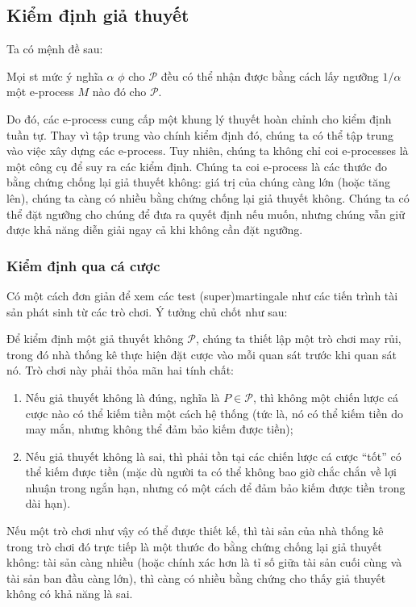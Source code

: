 \subsection{Kiểm định giả thuyết}

Ta có mệnh đề sau:

\begin{prop}
  Mọi \gls{st} mức ý nghĩa $\alpha$ $\phi$ cho $\mathcal{P}$ đều có thể nhận
  được bằng cách lấy ngưỡng $1/\alpha$ một e-process $M$ nào đó cho
  $\mathcal{P}$.
\end{prop}

Do đó, các e-process cung cấp một khung lý thuyết hoàn chỉnh cho kiểm định
tuần tự. Thay vì tập trung vào chính kiểm định đó, chúng ta có thể tập trung
vào việc xây dựng các e-process. Tuy nhiên, chúng ta không chỉ coi e-processes
là một công cụ để suy ra các kiểm định. Chúng ta coi e-process là các thước đo
bằng chứng chống lại giả thuyết không: giá trị của chúng càng lớn (hoặc tăng
lên), chúng ta càng có nhiều bằng chứng chống lại giả thuyết không. Chúng ta
có thể đặt ngưỡng cho chúng để đưa ra quyết định nếu muốn, nhưng chúng vẫn giữ
được khả năng diễn giải ngay cả khi không cần đặt ngưỡng.

\subsubsection{Kiểm định qua cá cược}

Có một cách đơn giản để xem các test (super)martingale như các tiến trình tài
sản phát sinh từ các trò chơi. Ý tưởng chủ chốt như sau:

Để kiểm định một giả thuyết không $\mathcal{P}$, chúng ta thiết lập một trò
chơi may rủi, trong đó nhà thống kê  thực hiện đặt cược vào mỗi quan sát trước
khi quan sát nó. Trò chơi này phải thỏa mãn hai tính chất:
\begin{enumerate}[label=(\alph*)]
  \item Nếu giả thuyết không là đúng, nghĩa là $P \in \mathcal{P}$, thì không
    một chiến lược cá cược nào có thể kiếm tiền một cách hệ thống (tức là, nó
    có thể kiếm tiền do may mắn, nhưng không thể đảm bảo kiếm được tiền);

  \item Nếu giả thuyết không là sai, thì phải tồn tại các chiến lược cá cược
    ``tốt'' có thể kiếm được tiền (mặc dù người ta có thể không bao giờ chắc
    chắn về lợi nhuận trong ngắn hạn, nhưng có một cách để đảm bảo kiếm được
    tiền trong dài hạn).
\end{enumerate} Nếu một trò chơi như vậy có thể được thiết kế, thì tài sản của
nhà thống kê trong trò chơi đó trực tiếp là một thước đo bằng chứng chống lại
giả thuyết không: tài sản càng nhiều (hoặc chính xác hơn là tỉ số giữa tài sản
cuối cùng và tài sản ban đầu càng lớn), thì càng có nhiều bằng chứng cho thấy
giả thuyết không có khả năng là sai.

